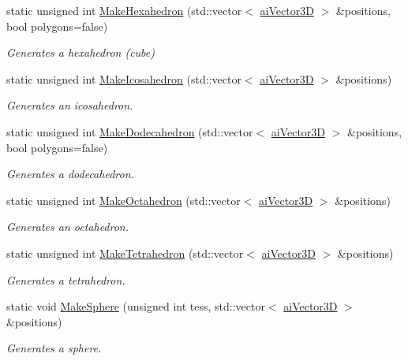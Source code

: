 \begin{DoxyCompactItemize}
\item 
static unsigned int \hyperlink{class_assimp_1_1_standard_shapes_a80bbbdedb949238d7ea6dda761948dfb}{Make\+Hexahedron} (std\+::vector$<$ \hyperlink{structai_vector3_d}{ai\+Vector3\+D} $>$ \&positions, bool polygons=false)
\begin{DoxyCompactList}\small\item\em Generates a hexahedron (cube) \end{DoxyCompactList}\item 
static unsigned int \hyperlink{class_assimp_1_1_standard_shapes_a2592a9c15a11d95181f78bd3f7c0458b}{Make\+Icosahedron} (std\+::vector$<$ \hyperlink{structai_vector3_d}{ai\+Vector3\+D} $>$ \&positions)
\begin{DoxyCompactList}\small\item\em Generates an icosahedron. \end{DoxyCompactList}\item 
static unsigned int \hyperlink{class_assimp_1_1_standard_shapes_a2738550132e77f535ddba6623f19fd76}{Make\+Dodecahedron} (std\+::vector$<$ \hyperlink{structai_vector3_d}{ai\+Vector3\+D} $>$ \&positions, bool polygons=false)
\begin{DoxyCompactList}\small\item\em Generates a dodecahedron. \end{DoxyCompactList}\item 
static unsigned int \hyperlink{class_assimp_1_1_standard_shapes_aef96c33aa1e4dfe77b483cbe47229c9c}{Make\+Octahedron} (std\+::vector$<$ \hyperlink{structai_vector3_d}{ai\+Vector3\+D} $>$ \&positions)
\begin{DoxyCompactList}\small\item\em Generates an octahedron. \end{DoxyCompactList}\item 
static unsigned int \hyperlink{class_assimp_1_1_standard_shapes_a0bc611df1adbd1f87366142f03b86168}{Make\+Tetrahedron} (std\+::vector$<$ \hyperlink{structai_vector3_d}{ai\+Vector3\+D} $>$ \&positions)
\begin{DoxyCompactList}\small\item\em Generates a tetrahedron. \end{DoxyCompactList}\item 
static void \hyperlink{class_assimp_1_1_standard_shapes_a6fa5ddd1a3942f714fb76ec9ac1f38c8}{Make\+Sphere} (unsigned int tess, std\+::vector$<$ \hyperlink{structai_vector3_d}{ai\+Vector3\+D} $>$ \&positions)
\begin{DoxyCompactList}\small\item\em Generates a sphere. \end{DoxyCompactList}\item 

\end{DoxyCompactItemize}
